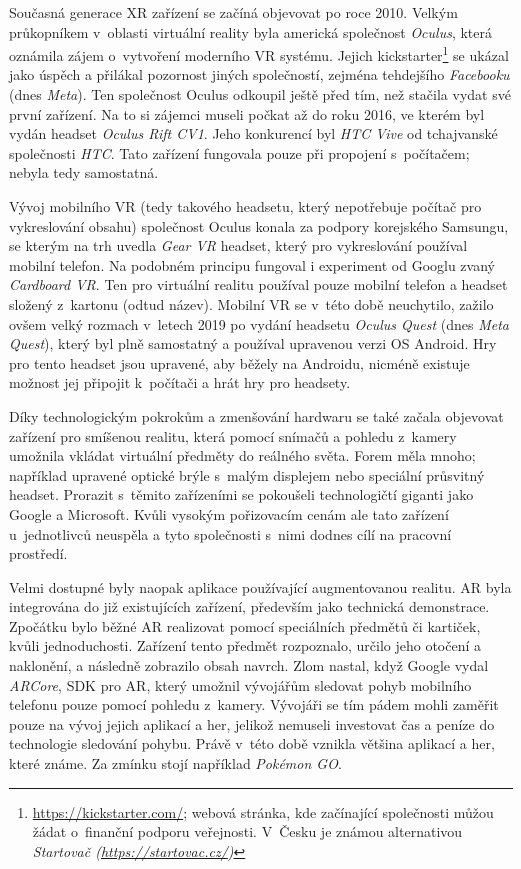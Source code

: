 Současná generace XR zařízení se začíná objevovat po roce 2010. Velkým průkopníkem v~oblasti virtuální reality byla americká společnost \textit{Oculus}, která oznámila zájem o~vytvoření moderního VR systému. Jejich kickstarter\footnote{\url{https://kickstarter.com/}; webová stránka, kde začínající společnosti můžou žádat o~finanční podporu veřejnosti. V~Česku je známou alternativou \em Startovač (\url{https://startovac.cz/})} se ukázal jako úspěch a přilákal pozornost jiných společností, zejména tehdejšího \textit{Facebooku} (dnes \textit{Meta}). Ten společnost Oculus odkoupil ještě před tím, než stačila vydat své první zařízení. Na to si zájemci museli počkat až do roku 2016, ve kterém byl vydán headset \textit{Oculus Rift CV1}. Jeho konkurencí byl \textit{HTC Vive} od tchajvanské společnosti \textit{HTC}. Tato zařízení fungovala pouze při propojení s~počítačem; nebyla tedy samostatná. \cite{otechnice_3}

Vývoj mobilního VR (tedy takového headsetu, který nepotřebuje počítač pro vykreslování obsahu) společnost Oculus konala za podpory korejského Samsungu, se kterým na trh uvedla \textit{Gear VR} \poml headset, který pro vykreslování používal mobilní telefon. Na podobném principu fungoval i experiment od Googlu zvaný \textit{Cardboard VR}. Ten pro virtuální realitu používal pouze mobilní telefon a headset složený z~kartonu (odtud název). Mobilní VR se v~této době neuchytilo, zažilo ovšem velký rozmach v~letech 2019 po vydání headsetu \textit{Oculus Quest} (dnes \textit{Meta Quest}), který byl plně samostatný a používal upravenou verzi OS Android. Hry pro tento headset jsou upravené, aby běžely na Androidu, nicméně existuje možnost jej připojit k~počítači a hrát hry pro  headsety. \cite{otechnice_3}

Díky technologickým pokrokům a zmenšování hardwaru se také začala objevovat zařízení pro smíšenou realitu, která pomocí snímačů a pohledu z~kamery umožnila vkládat virtuální předměty do reálného světa. Forem měla mnoho; například upravené optické brýle s~malým displejem nebo speciální průsvitný headset. Prorazit s~těmito zařízeními se pokoušeli technologičtí giganti jako Google a Microsoft. Kvůli vysokým pořizovacím cenám ale tato zařízení u~jednotlivců neuspěla a tyto společnosti s~nimi dodnes cílí na pracovní prostředí. \cite{google_glass_mobilenet}

Velmi dostupné byly naopak aplikace používající augmentovanou realitu. AR byla integrována do již existujících zařízení, především jako technická demonstrace. Zpočátku bylo běžné AR realizovat pomocí speciálních předmětů či kartiček, kvůli jednoduchosti. Zařízení tento předmět rozpoznalo, určilo jeho otočení a naklonění, a následně zobrazilo obsah navrch. Zlom nastal, když Google vydal \textit{ARCore}, \gls{SDK} pro AR, který umožnil vývojářům sledovat pohyb mobilního telefonu pouze pomocí pohledu z~kamery. Vývojáři se tím pádem mohli zaměřit pouze na vývoj jejich aplikací a her, jelikož nemuseli investovat čas a peníze do technologie sledování pohybu. Právě v~této době vznikla většina aplikací a her, které známe. Za zmínku stojí například \textit{Pokémon GO}. \cite{enwiki:1182789097}

